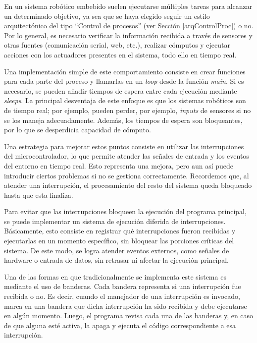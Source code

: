 En un sistema robótico embebido suelen ejecutarse múltiples tareas para alcanzar un determinado objetivo, ya sea que se haya elegido seguir un estilo arquitectónico del tipo ``Control de procesos'' (ver Sección \ref{arqControlProc}) o no. Por lo general, es necesario verificar la información recibida a través de sensores y otras fuentes (comunicación serial, web, etc.), realizar cómputos y ejecutar acciones con los actuadores presentes en el sistema, todo ello en tiempo real.

Una implementación simple de este comportamiento consiste en crear funciones para cada parte del proceso y llamarlas en un \textit{loop} desde la función \textit{main}. Si es necesario, se pueden añadir tiempos de espera entre cada ejecución mediante \textit{sleeps}. La principal desventaja de este enfoque es que los sistemas robóticos son de tiempo real; por ejemplo, pueden perder, por ejemplo, \textit{inputs} de sensores si no se los maneja adecuadamente. Además, los tiempos de espera son bloqueantes, por lo que se desperdicia capacidad de cómputo.

Una estrategia para mejorar estos puntos consiste en utilizar las interrupciones del microcontrolador, lo que permite atender las señales de entrada y los eventos del entorno en tiempo real. Esto representa una mejora, pero aun así puede introducir ciertos problemas si no se gestiona correctamente. Recordemos que, al atender una interrupción, el procesamiento del resto del sistema queda bloqueado hasta que esta finaliza.

Para evitar que las interrupciones bloqueen la ejecución del programa principal, se puede implementar un sistema de ejecución diferida de interrupciones. Básicamente, esto consiste en registrar qué interrupciones fueron recibidas y ejecutarlas en un momento específico, sin bloquear las porciones críticas del sistema. De este modo, se logra atender eventos externos, como señales de hardware o entrada de datos, sin retrasar ni afectar la ejecución principal.

Una de las formas en que tradicionalmente se implementa este sistema es mediante el uso de banderas. Cada bandera representa si una interrupción fue recibida o no. Es decir, cuando el manejador de una interrupción es invocado, marca en una bandera que dicha interrupción ha sido recibida y debe ejecutarse en algún momento. Luego, el programa revisa cada una de las banderas y, en caso de que alguna esté activa, la apaga y ejecuta el código correspondiente a esa interrupción.

